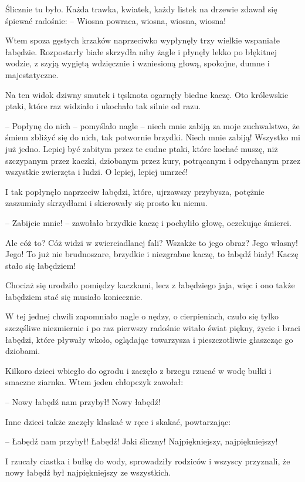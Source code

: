 \documentclass{book}
\begin{document}
Ślicznie tu było. Każda trawka, kwiatek, każdy listek na drzewie zdawał się śpiewać radośnie: -- Wiosna powraca, wiosna, wiosna, wiosna!

Wtem spoza gęstych krzaków naprzeciwko wypłynęły trzy wielkie wspaniałe łabędzie. Rozpostarły białe skrzydła niby żagle i płynęły lekko po błękitnej wodzie, z szyją wygiętą wdzięcznie i wzniesioną głową, spokojne, dumne i majestatyczne.

Na ten widok dziwny smutek i tęsknota ogarnęły biedne kaczę. Oto królewskie ptaki, które raz widziało i ukochało tak silnie od razu.

-- Popłynę do nich -- pomyślało nagle -- niech mnie zabiją za moje zuchwalstwo, że śmiem zbliżyć się do nich, tak potwornie brzydki. Niech mnie zabiją! Wszystko mi już jedno. Lepiej być zabitym przez te cudne ptaki, które kochać muszę, niż szczypanym przez kaczki, dziobanym przez kury, potrącanym i odpychanym przez wszystkie zwierzęta i ludzi. O lepiej, lepiej umrzeć!

I tak popłynęło naprzeciw łabędzi, które, ujrzawszy przybysza, potężnie zaszumiały skrzydłami i skierowały się prosto ku niemu.

-- Zabijcie mnie! -- zawołało brzydkie kaczę i pochyliło głowę, oczekując śmierci.

Ale cóż to? Cóż widzi w zwierciadlanej fali? Wszakże to jego obraz? Jego własny! Jego! To już nie brudnoszare, brzydkie i niezgrabne kaczę, to łabędź biały! Kaczę stało się łabędziem!

Chociaż się urodziło pomiędzy kaczkami, lecz z łabędziego jaja, więc i ono także łabędziem stać się musiało koniecznie.

W tej jednej chwili zapomniało nagle o nędzy, o cierpieniach, czuło się tylko szczęśliwe niezmiernie i po raz pierwszy radośnie witało świat piękny, życie i braci łabędzi, które pływały wkoło, oglądając towarzysza i pieszczotliwie głaszcząc go dziobami.

Kilkoro dzieci wbiegło do ogrodu i zaczęło z brzegu rzucać w wodę bułki i smaczne ziarnka. Wtem jeden chłopczyk zawołał:

-- Nowy łabędź nam przybył! Nowy łabędź!

Inne dzieci także zaczęły klaskać w ręce i skakać, powtarzając:

-- Łabędź nam przybył! Łabędź! Jaki śliczny! Najpiękniejszy, najpiękniejszy!

I rzucały ciastka i bułkę do wody, sprowadziły rodziców i wszyscy przyznali, że nowy łabędź był najpiękniejszy ze wszystkich.
\end{document}
